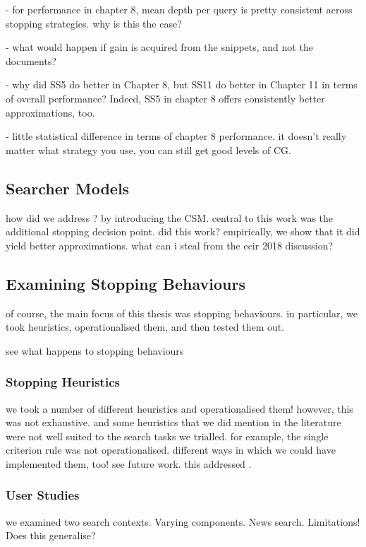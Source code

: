 - for performance in chapter 8, mean depth per query is pretty consistent across stopping strategies. why is this the case?

- what would happen if gain is acquired from the snippets, and not the documents?

- why did SS5 do better in Chapter 8, but SS11 do better in Chapter 11 in terms of overall performance? Indeed, SS5 in chapter 8 offers consistently better approximations, too.

- little statistical difference in terms of chapter 8 performance. it doesn't really matter what strategy you use, you can still get good levels of CG.

\subsection{Searcher Models}

how did we address ? by introducing the CSM.
central to this work was the additional stopping decision point.
did this work?
empirically, we show that it did yield better approximations.
what can i steal from the ecir 2018 discussion?

\subsection{Examining Stopping Behaviours}

of course, the main focus of this thesis was stopping behaviours.
in particular, we took heuristics, operationalised them, and then tested them out.

see what happens to stopping behaviours 

\subsubsection{Stopping Heuristics}
we took a number of different heuristics and operationalised them!
however, this was not exhaustive.
and some heuristics that we did mention in the literature were not well suited to the search tasks we trialled.
for example, the single criterion rule was not operationalised.
different ways in which we could have implemented them, too! see future work.
this addressed .

\subsubsection{User Studies}
we examined two search contexts. Varying components. News search. Limitations! Does this generalise?

